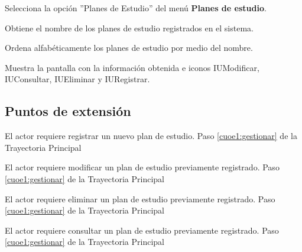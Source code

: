 \begin{UCtrayectoria}
	
	\UCpaso [\UCactor] Selecciona la opción ''Planes de Estudio'' del menú \textbf{Planes de estudio}. %
	
	\UCpaso [\UCsist] Obtiene el nombre de los planes de estudio registrados en el sistema.
	
	\UCpaso [\UCsist] Ordena alfabéticamente los planes de estudio por medio del nombre.
	
	\UCpaso[\UCsist] Muestra la pantalla  con la información obtenida e iconos IUModificar, IUConsultar, IUEliminar y IURegistrar. 
	\label{cuoe1:gestionar}
\end{UCtrayectoria}

\subsection{Puntos de extensión}

\UCExtensionPoint 
{El actor requiere registrar un nuevo plan de estudio.}
{Paso \ref{cuoe1:gestionar} de la Trayectoria Principal}
{}

\UCExtensionPoint 
{El actor requiere modificar un plan de estudio previamente registrado.}
{Paso \ref{cuoe1:gestionar} de la Trayectoria Principal}
{}

\UCExtensionPoint 
{El actor requiere eliminar un plan de estudio previamente registrado.}
{Paso \ref{cuoe1:gestionar} de la Trayectoria Principal}
{}

\UCExtensionPoint 
{El actor requiere consultar un plan de estudio previamente registrado.}
{Paso \ref{cuoe1:gestionar} de la Trayectoria Principal}
{}

